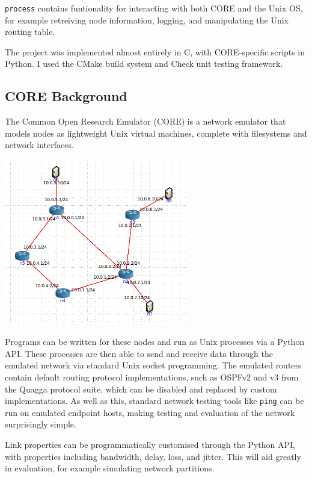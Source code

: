 \documentclass[10pt,twoside,a4paper]{article}
\begin{document}
\texttt{process} contains funtionality for interacting with both CORE and the Unix OS, for example retreiving node information, logging, and manipulating the Unix routing table.

The project was implemented almost entirely in C, with CORE-specific scripts in Python. I used the CMake build system and Check unit testing framework.


\subsection{CORE Background}

The Common Open Research Emulator (CORE) is a network emulator that models nodes as lightweight Unix virtual machines, complete with filesystems and network interfaces.

\begin{minipage}{1\textwidth} \centering
	\includegraphics[width=0.6\textwidth]{6-core}
\end{minipage}

Programs can be written for these nodes and run as Unix processes via a Python API. These processes are then able to send and receive data through the emulated network via standard Unix socket programming. The emulated routers contain default routing protocol implementations, such as OSPFv2 and v3 from the Quagga protocol suite, which can be disabled and replaced by custom implementations. As well as this, standard network testing tools like \texttt{ping} can be run on emulated endpoint hosts, making testing and evaluation of the network surprisingly simple.

Link properties can be programmatically customised through the Python API, with properties including bandwidth, delay, loss, and jitter. This will aid greatly in evaluation, for example simulating network partitions.
\end{document}
